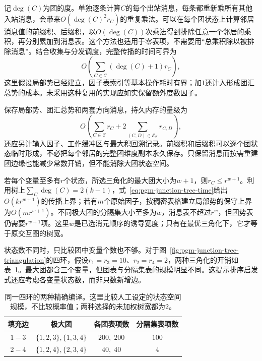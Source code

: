 记$\deg(C)$为团的度。单独逐条计算$C$的每个出站消息，每条都重新乘所有其他入站消息，会带来$O(\deg(C)^2r_C)$的重复乘法。可以在每个团状态上计算邻居消息值的前缀积、后缀积，以$O(\deg(C))$次乘法得到排除任意一个邻居的乘积，再分别累加到消息表。这个方法也适用于零表项，不需要用“总乘积除以被排除消息”。结合收集与分发调度，完整传播的时间可界为
\begin{equation}
  O\!\left(\sum_{C\in\mathcal{C}}(\deg(C)+1)r_C\right),
  \label{eq:pgm-junction-tree-time}
\end{equation}
这里假设局部势已经建立，因子表索引等基本操作耗时有界；加$1$还计入形成团汇总势的成本。未采用这种复用的实现应如实保留额外度数因子。

保存局部势、团汇总势和两套方向消息，持久内存的量级为
\begin{equation}
  O\!\left(
    \sum_{C\in\mathcal{C}}r_C+
    2\sum_{(C,D)\in\mathcal{E}_{\mathcal{T}}}r_{C,D}
  \right),
  \label{eq:pgm-junction-tree-memory}
\end{equation}
还应另计输入因子、工作缓冲区与最大积回溯记录。前缀积和后缀积可以逐个团状态临时形成，不必把每个邻居的完整团维度副本永久保存。只保留消息而按需重建团边缘也能减少常数开销，但不能消除大团状态空间。

若每个变量至多有$r$个状态，所选三角化的最大团大小为$w+1$，则$r_C\leq r^{w+1}$。利用树上$\sum_C\deg(C)=2(k-1)$，式~\eqref{eq:pgm-junction-tree-time}给出$O(kr^{w+1})$的传播上界；若有$m$个原始因子，按稠密表格建立局部势的保守上界为$O(mr^{w+1})$。不同极大团的分隔集大小至多为$w$，消息表不超过$r^w$，但团势表仍需要$r^{w+1}$项。这里$w$是已选消元顺序的诱导宽度；只有在最优三角化下，它才等于原交互图的树宽。

状态数不同时，只比较团中变量个数也不够。对于图~\ref{fig:pgm-junction-tree-triangulation}的四环，假设$r_1=r_3=10$、$r_2=r_4=2$，两种三角化的开销如表~\ref{tab:pgm-junction-tree-triangulation-cost}。最大团都含三个变量，但团表与分隔集表的规模明显不同。这提示排序启发式还应考虑各变量状态数，而非只数新增边。

\begin{table}[htbp]
  \centering
  \begin{tabular}{cccc}
    \toprule
    填充边 & 极大团 & 各团表项数 & 分隔集表项数\\
    \midrule
    $1-3$ & $\{1,2,3\},\{1,3,4\}$ & $200,\;200$ & $100$\\
    $2-4$ & $\{1,2,4\},\{2,3,4\}$ & $40,\;40$ & $4$\\
    \bottomrule
  \end{tabular}
  \caption{同一四环的两种精确编译。这里比较人工设定的状态空间规模，不比较概率值；两种选择的未加权树宽都为$2$。}
  \label{tab:pgm-junction-tree-triangulation-cost}
\end{table}

